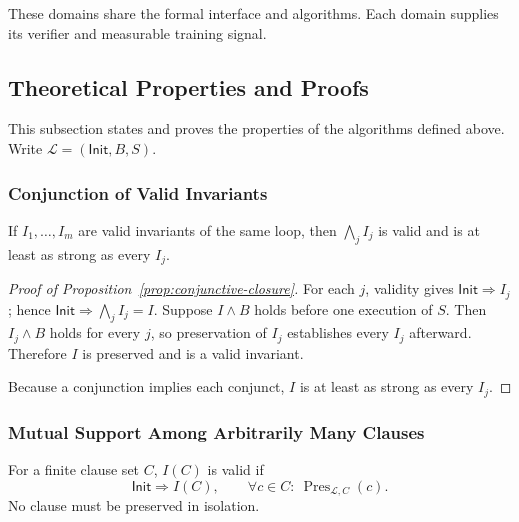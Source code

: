 These domains share the formal interface and algorithms.  Each domain supplies
its verifier and measurable training signal.

\subsection{Theoretical Properties and Proofs}
\label{app:composition-proofs}

This subsection states and proves the properties of the algorithms defined
above.  Write
\(\mathcal L=(\mathsf{Init},B,S)\).

\subsubsection{Conjunction of Valid Invariants}

\begin{proposition}
\label{prop:conjunctive-closure}
If \(I_1,\ldots,I_m\) are valid invariants of the same loop, then
\(\bigwedge_j I_j\) is valid and is at least as strong as every \(I_j\).
\end{proposition}

\begin{proof}[Proof of Proposition~\ref{prop:conjunctive-closure}]
For each \(j\), validity gives \(\mathsf{Init}\Rightarrow I_j\); hence
\(\mathsf{Init}\Rightarrow\bigwedge_j I_j=I\).  Suppose \(I\wedge B\) holds before one
execution of \(S\).  Then \(I_j\wedge B\) holds for every \(j\), so preservation
of \(I_j\) establishes every \(I_j\) afterward.  Therefore \(I\) is preserved
and is a valid invariant.

Because a conjunction implies each conjunct, \(I\) is at least as strong as
every \(I_j\).
\end{proof}

\subsubsection{Mutual Support Among Arbitrarily Many Clauses}

\begin{proposition}
\label{prop:mutual-support}
For a finite clause set \(C\), \(I(C)\) is valid if
\begin{equation}
  \mathsf{Init}\Rightarrow I(C),
  \qquad
  \forall c\in C:\ \operatorname{Pres}_{\mathcal L,C}(c).
  \label{eq:formal-mutual-support}
\end{equation}
No clause must be preserved in isolation.
\end{proposition}

